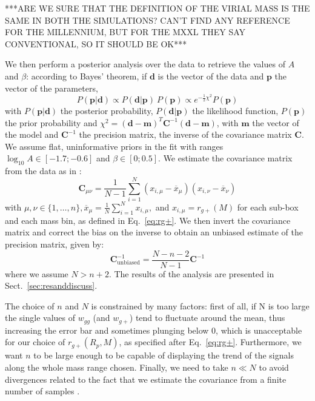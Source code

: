 \documentclass[a4paper,fleqn,usenatbib]{mnras}
\begin{document}
***ARE WE SURE THAT THE DEFINITION OF THE VIRIAL MASS IS THE SAME IN BOTH THE SIMULATIONS? CAN'T FIND ANY REFERENCE FOR THE MILLENNIUM, BUT FOR THE MXXL THEY SAY CONVENTIONAL, SO IT SHOULD BE OK***

We then perform a posterior analysis over the data to retrieve the values of $A$ and $\beta$: according to Bayes' theorem, if $\boldsymbol{d}$ is the vector of the data and $\boldsymbol{p}$ the vector of the parameters, 
\begin{equation}
    P(\boldsymbol{p} | \boldsymbol{d}) \propto P(\boldsymbol{d} | \boldsymbol{p}) \ P(\boldsymbol{p}) \propto e^{-\frac{1}{2} \chi ^2} P(\boldsymbol{p})
	\label{eq:bayes}
\end{equation}
with  $P(\boldsymbol{p} | \boldsymbol{d})$ the posterior probability,  $P(\boldsymbol{d} | \boldsymbol{p})$ the likelihood function, $P(\boldsymbol{p})$ the prior probability and $\chi ^2 = (\boldsymbol{d} - \boldsymbol{m})^T \mathbf{C}^{-1} (\boldsymbol{d} - \boldsymbol{m})$, with $\boldsymbol{m}$ the vector of the model and $\mathbf{C}^{-1}$ the precision matrix, the inverse of the covariance matrix $\mathbf{C}$. We assume flat, uninformative priors in the fit with ranges $\log_{10} A \in [-1.7;-0.6]$  and $\beta \in [0;0.5]$. We estimate the covariance matrix from the data as in \citet{Tayloretal2013}:
\begin{equation}
     \mathbf{C}_{\mu \nu} = \frac{1}{N-1} \sum_{i = 1}^{N} (x_{i, \mu} - \overline{x}_{\mu})(x_{i, \nu} - \overline{x}_{\nu})
	\label{eq:covariance}
\end{equation}
with $\mu, \nu \in \{1, \dotso, n\},  \overline{x}_{\mu} = \frac{1}{N} \sum_{i=1}^{N} x_{i, \mu},$ and $x_{i, \mu}= r_{g+}(M)$ for each sub-box and each mass bin, as defined in Eq.~\ref{eq:rg+}. We then invert the covariance matrix and correct the bias on the inverse to obtain an unbiased estimate of the precision matrix, given by:
\begin{equation}
     \mathbf{C}^{-1}_{\mbox{unbiased}} = \frac{N - n -2}{N-1}  \mathbf{C}^{-1}
	\label{eq:precunbiased}
\end{equation}
where we assume $N > n+2$. The results of the analysis are presented in Sect.~\ref{sec:resanddiscuss}.

The choice of $n$ and $N$ is constrained by many factors: first of all, if N is too large the single values of $w_{gg}$ (and $w_{g+}$) tend to fluctuate around the mean, thus increasing the error bar and sometimes plunging below 0, which is unacceptable for our choice of $ r_{g+} (R_p, M)$, as specified after Eq.~\ref{eq:rg+}. Furthermore, we want $n$ to be large enough to be capable of displaying the trend of the signals along the whole mass range chosen. Finally, we need to take $n \ll N$ to avoid divergences related to the fact that we estimate the covariance from a finite number of samples \citep{Tayloretal2013}.
\end{document}
